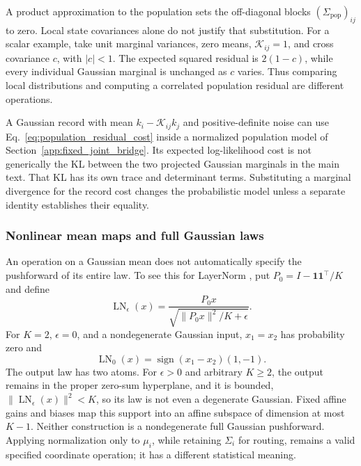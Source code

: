\documentclass[twoside,11pt]{article}
\begin{document}
A product approximation to the population sets the off-diagonal blocks \((\Sigma_{\mathrm{pop}})_{ij}\) to zero. Local state covariances alone do not justify that substitution. For a scalar example, take unit marginal variances, zero means, \(\mathcal K_{ij}=1\), and cross covariance \(c\), with \(|c|<1\). The expected squared residual is \(2(1-c)\), while every individual Gaussian marginal is unchanged as \(c\) varies. Thus comparing local distributions and computing a correlated population residual are different operations.

A Gaussian record with mean \(k_i-\mathcal K_{ij}k_j\) and positive-definite noise can use Eq.~\eqref{eq:population_residual_cost} inside a normalized population model of Section~\ref{app:fixed_joint_bridge}. Its expected log-likelihood cost is not generically the KL between the two projected Gaussian marginals in the main text. That KL has its own trace and determinant terms. Substituting a marginal divergence for the record cost changes the probabilistic model unless a separate identity establishes their equality.

\subsubsection{Nonlinear mean maps and full Gaussian laws}
\label{sec:nonlinear_gaussian_scope}

An operation on a Gaussian mean does not automatically specify the pushforward of its entire law. To see this for LayerNorm \citep{ba2016layernorm}, put \(P_0=I-\mathbf1\mathbf1^\top/K\) and define
\begin{equation}
\operatorname{LN}_\epsilon(x)
=\frac{P_0x}{\sqrt{\|P_0x\|^2/K+\epsilon}}.
\label{eq:layernorm_gaussian_scope}
\end{equation}
For \(K=2\), \(\epsilon=0\), and a nondegenerate Gaussian input, \(x_1=x_2\) has probability zero and
\begin{equation}
\operatorname{LN}_0(x)
=\operatorname{sign}(x_1-x_2)(1,-1).
\label{eq:layernorm_two_atoms}
\end{equation}
The output law has two atoms. For \(\epsilon>0\) and arbitrary \(K\ge2\), the output remains in the proper zero-sum hyperplane, and it is bounded, \(\|\operatorname{LN}_\epsilon(x)\|^2<K\), so its law is not even a degenerate Gaussian. Fixed affine gains and biases map this support into an affine subspace of dimension at most \(K-1\). Neither construction is a nondegenerate full Gaussian pushforward. Applying normalization only to \(\mu_i\), while retaining \(\Sigma_i\) for routing, remains a valid specified coordinate operation; it has a different statistical meaning.
\end{document}
